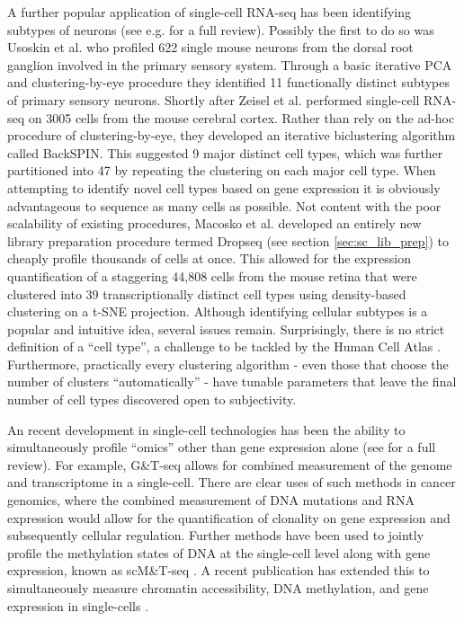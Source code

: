 A further popular application of single-cell RNA-seq has been identifying subtypes of neurons (see e.g. \cite{Poulin2016-bl} for a full review). Possibly the first to do so was Usoskin et al. \cite{Usoskin2015-gp} who profiled 622 single mouse neurons from the dorsal root ganglion involved in the primary sensory system. Through a basic iterative PCA and clustering-by-eye procedure they identified 11 functionally distinct subtypes of primary sensory neurons. Shortly after Zeisel et al. \cite{Zeisel2015-cv} performed single-cell RNA-seq on 3005 cells from the mouse cerebral cortex. Rather than rely on the ad-hoc procedure of clustering-by-eye, they developed an iterative biclustering algorithm called BackSPIN. This suggested 9 major distinct cell types, which was further partitioned into 47 by repeating the clustering on each major cell type. When attempting to identify novel cell types based on gene expression it is obviously advantageous to sequence as many cells as possible. Not content with the poor scalability of existing procedures, Macosko et al. \cite{Macosko2015-ek} developed an entirely new library preparation procedure termed Dropseq (see section \ref{sec:sc_lib_prep}) to cheaply profile thousands of cells at once. This allowed for the expression quantification of a staggering 44,808 cells from the mouse retina that were clustered into 39 transcriptionally distinct cell types using density-based clustering on a t-SNE projection. Although identifying cellular subtypes is a popular and intuitive idea, several issues remain. Surprisingly, there is no strict definition of a ``cell type'', a challenge to be tackled by the Human Cell Atlas \cite{Regev2017-sl}. Furthermore, practically every clustering algorithm - even those that choose the number of clusters ``automatically'' - have tunable parameters that leave the  final number of cell types discovered open to subjectivity.

An recent development in single-cell technologies has been the ability to simultaneously profile ``omics'' other than gene expression alone (see \cite{Macaulay2017-nn} for a full review). For example, G\&T-seq \cite{Macaulay2015-ok} allows for combined measurement of the genome and transcriptome in a single-cell. There are clear uses of such methods in cancer genomics, where the combined measurement of DNA mutations and RNA expression would allow for the quantification of clonality on gene expression and subsequently cellular regulation. Further methods have been used to jointly profile the methylation states of DNA at the single-cell level along with gene expression, known as scM\&T-seq 
\cite{Angermueller2016-ll,Hu2016-bz}. A recent publication has extended this to simultaneously measure chromatin accessibility, DNA methylation, and gene expression in single-cells \cite{Clark2017-pc}.

